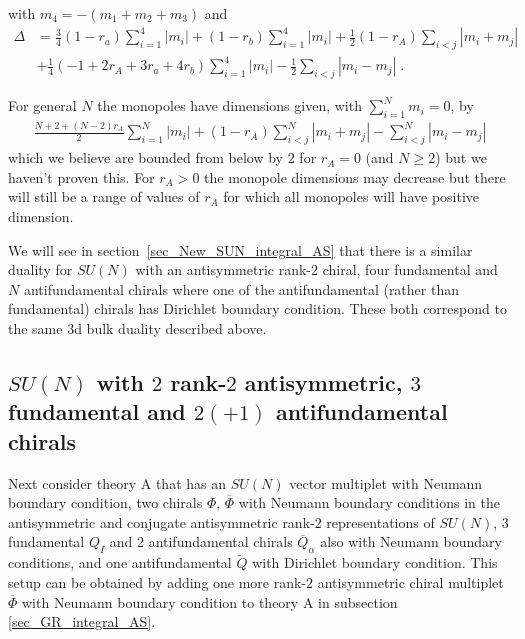\documentclass[12pt]{article}
\numberwithin{equation}{section}
\begin{document}
with $m_4 = - (m_1 + m_2 + m_3)$ and
\begin{align}
\Delta&=
\frac34 (1-r_a)\sum_{i=1}^4 |m_i|
+(1-r_b)\sum_{i=1}^4|m_i|
+\frac12 (1-r_A)\sum_{i<j}|m_i+m_j|
\nonumber\\
&+\frac14(-1+2r_A+3r_a+4r_b)\sum_{i=1}^4|m_i|
-\frac12 \sum_{i<j}|m_i-m_j| \; .
\end{align}

For general $N$ the monopoles have dimensions given, with $\sum_{i=1}^N m_i = 0$, by
\begin{align}
\label{Mono_Ch_suN_Np4_1}
    \frac{N+2+(N-2)r_A}{2}\sum_{i = 1}^N |m_i| + (1 - r_A) \sum_{i < j}^N |m_i + m_j| - \sum_{i < j}^N |m_i - m_j|
\end{align}
which we believe are bounded from below by $2$ for $r_A = 0$ (and $N \ge 2$) but we haven't proven this.
For $r_A > 0$ the monopole dimensions may decrease but there will still be a range of values of $r_A$ for which all monopoles will have positive dimension.

We will see in section~\ref{sec_New_SUN_integral_AS} that there is a similar duality for $SU(N)$ with an antisymmetric rank-$2$ chiral, four fundamental and $N$ antifundamental chirals where one of the antifundamental (rather than fundamental) chirals has Dirichlet boundary condition.
These both correspond to the same 3d bulk duality described above. 


\subsection{$SU(N)$ with $2$ rank-$2$ antisymmetric, $3$ fundamental and $2(+1)$ antifundamental chirals}
\label{sec_G_integral_ASAS}
Next consider theory A that has an $SU(N)$ vector multiplet with Neumann boundary condition, 
two chirals $\Phi$, $\overline{\Phi}$ with Neumann boundary conditions in the antisymmetric 
and conjugate antisymmetric rank-2 representations of $SU(N)$, 3 fundamental $Q_{I}$ and
2 antifundamental chirals $\overline{Q}_{\alpha}$ also with Neumann boundary conditions, 
and one antifundamental $\widetilde{Q}$ with Dirichlet boundary condition. 
This setup can be obtained by adding one more rank-$2$ antisymmetric chiral multiplet $\overline{\Phi}$ with Neumann boundary condition 
to theory A in subsection \ref{sec_GR_integral_AS}.  
\end{document}
